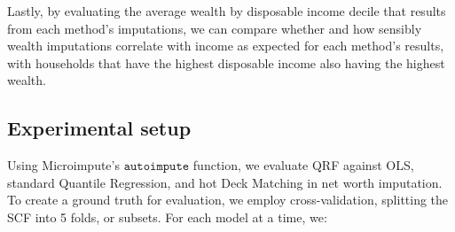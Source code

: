 Lastly, by evaluating the average wealth by disposable income decile that results from each method's imputations, we can compare whether and how sensibly wealth imputations correlate with income as expected for each method's results, with households that have the highest disposable income also having the highest wealth. 

\subsection{Experimental setup}

Using Microimpute's $\texttt{autoimpute}$ function, we evaluate QRF against OLS, standard Quantile Regression, and hot Deck Matching in net worth imputation. To create a ground truth for evaluation, we employ cross-validation, splitting the SCF into 5 folds, or subsets. For each model at a time, we:

